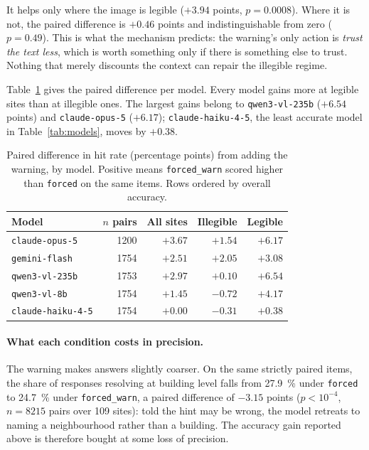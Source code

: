 \documentclass[10pt,a4paper]{article}
\begin{document}
It helps only where the image is legible ($+\num{3.94}$ points,
$p=\num{0.0008}$). Where it is not, the paired difference is $+\num{0.46}$
points and indistinguishable from zero ($p=\num{0.49}$). This is what the mechanism
predicts: the warning's only action is \emph{trust the text less}, which is
worth something only if there is something else to trust. Nothing that merely
discounts the context can repair the illegible regime.

Table~\ref{tab:mitigmodel} gives the paired difference per model. Every model
gains more at legible sites than at illegible ones. The largest gains belong to
\texttt{qwen3-vl-235b} ($+\num{6.54}$ points) and \texttt{claude-opus-5}
($+\num{6.17}$); \texttt{claude-haiku-4-5}, the least accurate model in
Table~\ref{tab:models}, moves by $+\num{0.38}$.

\begin{table}[!htbp]
\centering
\caption{Paired difference in hit rate (percentage points) from adding the
warning, by model. Positive means \texttt{forced\_warn} scored higher than
\texttt{forced} on the same items. Rows ordered by overall accuracy.}
\label{tab:mitigmodel}
\begin{tabular}{lrrrr}
\toprule
Model & $n$ pairs & All sites & Illegible & Legible \\
\midrule
\texttt{claude-opus-5}    & 1200 & $+3.67$ & $+1.54$ & $+6.17$ \\
\texttt{gemini-flash}     & 1754 & $+2.51$ & $+2.05$ & $+3.08$ \\
\texttt{qwen3-vl-235b}    & 1753 & $+2.97$ & $+0.10$ & $+6.54$ \\
\texttt{qwen3-vl-8b}      & 1754 & $+1.45$ & $-0.72$ & $+4.17$ \\
\texttt{claude-haiku-4-5} & 1754 & $+0.00$ & $-0.31$ & $+0.38$ \\
\bottomrule
\end{tabular}
\end{table}

\paragraph{What each condition costs in precision.} The warning makes answers
slightly coarser. On the same strictly paired items, the share of responses
resolving at building level falls from \SI{27.9}{\percent} under
\texttt{forced} to \SI{24.7}{\percent} under \texttt{forced\_warn}, a paired
difference of $-\num{3.15}$ points ($p<10^{-4}$, $n=\num{8215}$ pairs over
\num{109} sites): told the hint
may be wrong, the model retreats to naming a neighbourhood rather than a
building. The accuracy gain reported above is therefore bought at some loss of
precision.
\end{document}
